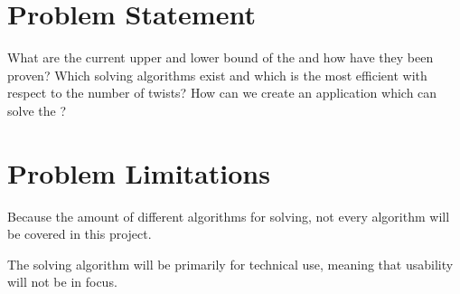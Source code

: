 \section{Problem Statement}
What are the current upper and lower bound of the \rubik{} and how have they been proven? \newline\newline
Which solving algorithms exist and which is the most efficient with respect to the number of twists?\newline\newline
How can we create an application which can solve the \rubik{}?

\section{Problem Limitations}
Because the amount of different algorithms for \rubik{} solving, not every algorithm will be covered in this project.

The \rubik{} solving algorithm will be primarily for technical use, meaning that usability will not be in focus.